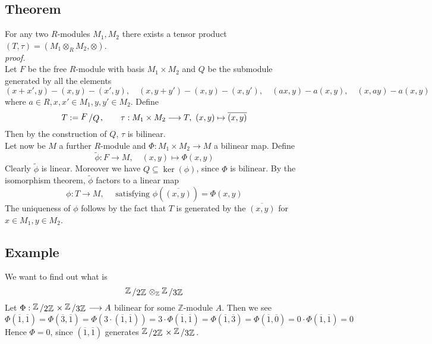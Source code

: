 \documentclass[12pt]{book}
\newcommand{\slant}[2]{{\raisebox{.1em}{$#1$}\left/\raisebox{-.1em}{$#2$}\right.}}
\begin{document}
\begin{spacing}{1.3}
\subsection{Theorem}%
For any two $R$-modules $M_1, M_2$ there exists a tensor product $(T, \tau)=(M_1 \otimes_R M_2, \otimes)$.\\
\textit{proof.}\\
Let $F$ be the free $R$-module with basis $M_1 \times M_2$ and $Q$ be the submodule generated by all the elements
$$(x+x',y)-(x,y)-(x',y), \quad (x,y+y')-(x,y)-(x,y'), \quad (ax,y)-a(x,y), \quad (x,ay)-a(x,y)$$
where $a \in R, x,x' \in M_1, y,y' \in M_2$. 
Define $$T:= \slant{F}{Q}, \qquad \tau: M_1 \times M_2 \longrightarrow T, \ (x,y) \mapsto \overline{(x,y)}$$
Then by the construction of $Q$, $\tau$ is bilinear.\\
Let now be $M$ a further $R$-module and $\Phi: M_1 \times M_2 \longrightarrow M$ a bilinear map.
Define $$\tilde{\phi}: F \longrightarrow M, \quad (x,y) \mapsto \Phi(x,y)$$
Clearly $\tilde{\phi}$ is linear. Moreover we have $Q \subseteq \ker(\phi)$, since $\Phi$ is bilinear.
By the isomorphism theorem, $\tilde{\phi}$ factors to a linear map
$$\phi: T \longrightarrow M, \quad \textrm{ satisfying } \phi\left(\overline{(x,y)}\right)= \Phi(x,y)$$
The uniqueness of $\phi$ follows by the fact that $T$ is generated by the $\overline{(x,y)}$ for $x \in M_1, y \in M_2$. 

\subsection*{Example} %
\titleformat{\subsection}{\normalfont\normalsize\bfseries}{}{0em}{#1 \thesubsection}
We want to find out what is
$$\slant{\mathbb{Z}}{2 \mathbb{Z}} \otimes_{\mathbb{Z}} \slant{\mathbb{Z}}{3 \mathbb{Z}}$$
Let $\Phi: \slant{\mathbb{Z}}{2 \mathbb{Z}} \times \slant{\mathbb{Z}}{3 \mathbb{Z}} \longrightarrow A$ bilinear for some $\mathbb{Z}$-module $A$. Then we see
$$\Phi(\overline{1}, \overline{1})=\Phi(\overline{3}, \overline{1})=\Phi\left(3 \cdot (\overline{1}, \overline{1})\right)= 3 \cdot \Phi(\overline{1}, \overline{1})=\Phi(\overline{1}, \overline{3})=\Phi(\overline{1},\overline{0})=0\cdot \Phi(\overline{1}, \overline{1}) =0$$
Hence $\Phi=0$, since $(\overline{1}, \overline{1})$ generates $\slant{\mathbb{Z}}{2 \mathbb{Z}} \times \slant{\mathbb{Z}}{3 \mathbb{Z}}$. 


\end{spacing}
\end{document}
